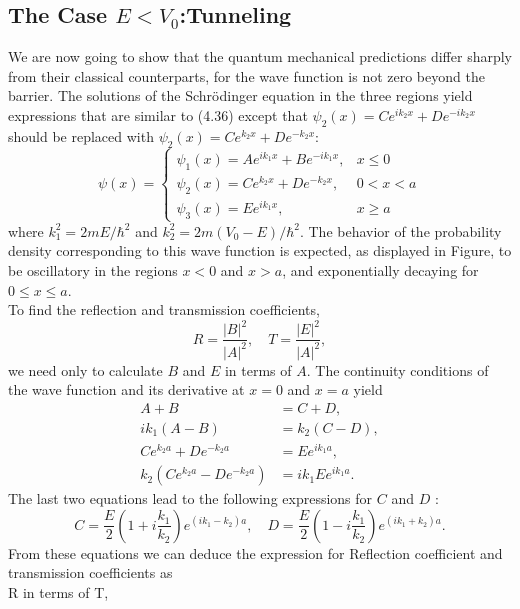 \subsection{The Case $E<V_0$:Tunneling}
We are now going to show that the quantum mechanical predictions differ sharply from their classical counterparts, for the wave function is not zero beyond the barrier. The solutions of the Schrödinger equation in the three regions yield expressions that are similar to (4.36) except that $\psi_{2}(x)=C e^{i k_{2} x}+D e^{-i k_{2} x}$ should be replaced with $\psi_{2}(x)=C e^{k_{2} x}+D e^{-k_{2} x}:$\\
$$\psi(x)= \begin{cases}\psi_{1}(x)=A e^{i k_{1} x}+B e^{-i k_{1} x}, & x \leq 0 \\ \psi_{2}(x)=C e^{k_{2} x}+D e^{-k_{2} x}, & 0<x<a \\ \psi_{3}(x)=E e^{i k_{1} x}, & x \geq a\end{cases}$$
where $k_{1}^{2}=2 m E / \hbar^{2}$ and $k_{2}^{2}=2 m\left(V_{0}-E\right) / \hbar^{2}$. The behavior of the probability density corresponding to this wave function is expected, as displayed in Figure, to be oscillatory in the regions $x<0$ and $x>a$, and exponentially decaying for $0 \leq x \leq a$.\\
To find the reflection and transmission coefficients,
$$
R=\frac{|B|^{2}}{|A|^{2}}, \quad T=\frac{|E|^{2}}{|A|^{2}},
$$
we need only to calculate $B$ and $E$ in terms of $A$. The continuity conditions of the wave function and its derivative at $x=0$ and $x=a$ yield
$$\begin{aligned}
	A+B &=C+D, \\
	i k_{1}(A-B) &=k_{2}(C-D), \\
	C e^{k_{2} a}+D e^{-k_{2} a} &=E e^{i k_{1} a}, \\
	k_{2}\left(C e^{k_{2} a}-D e^{-k_{2} a}\right) &=i k_{1} E e^{i k_{1} a} .
\end{aligned}$$
The last two equations lead to the following expressions for $C$ and $D$ :
$$
C=\frac{E}{2}\left(1+i \frac{k_{1}}{k_{2}}\right) e^{\left(i k_{1}-k_{2}\right) a}, \quad D=\frac{E}{2}\left(1-i \frac{k_{1}}{k_{2}}\right) e^{\left(i k_{1}+k_{2}\right) a} .
$$
From these equations we can deduce the expression for Reflection coefficient and transmission coefficients as\\
R in terms of T,\\
